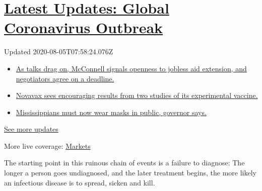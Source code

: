 \hypertarget{latest-updates-global-coronavirus-outbreak}{%
\section{\texorpdfstring{\href{https://www.nytimes3xbfgragh.onion/2020/08/04/world/coronavirus-cases.html?action=click\&pgtype=Article\&state=default\&region=MAIN_CONTENT_1\&context=storylines_live_updates}{Latest
Updates: Global Coronavirus
Outbreak}}{Latest Updates: Global Coronavirus Outbreak}}\label{latest-updates-global-coronavirus-outbreak}}

Updated 2020-08-05T07:58:24.076Z

\begin{itemize}
\tightlist
\item
  \href{https://www.nytimes3xbfgragh.onion/2020/08/04/world/coronavirus-cases.html?action=click\&pgtype=Article\&state=default\&region=MAIN_CONTENT_1\&context=storylines_live_updates\#link-762df92}{As
  talks drag on, McConnell signals openness to jobless aid extension,
  and negotiators agree on a deadline.}
\item
  \href{https://www.nytimes3xbfgragh.onion/2020/08/04/world/coronavirus-cases.html?action=click\&pgtype=Article\&state=default\&region=MAIN_CONTENT_1\&context=storylines_live_updates\#link-1228a480}{Novavax
  sees encouraging results from two studies of its experimental
  vaccine.}
\item
  \href{https://www.nytimes3xbfgragh.onion/2020/08/04/world/coronavirus-cases.html?action=click\&pgtype=Article\&state=default\&region=MAIN_CONTENT_1\&context=storylines_live_updates\#link-794484ed}{Mississippians
  must now wear masks in public, governor says.}
\end{itemize}

\href{https://www.nytimes3xbfgragh.onion/2020/08/04/world/coronavirus-cases.html?action=click\&pgtype=Article\&state=default\&region=MAIN_CONTENT_1\&context=storylines_live_updates}{See
more updates}

More live coverage:
\href{https://www.nytimes3xbfgragh.onion/live/2020/08/04/business/stock-market-today-coronavirus?action=click\&pgtype=Article\&state=default\&region=MAIN_CONTENT_1\&context=storylines_live_updates}{Markets}

The starting point in this ruinous chain of events is a failure to
diagnose: The longer a person goes undiagnosed, and the later treatment
begins, the more likely an infectious disease is to spread, sicken and
kill.

